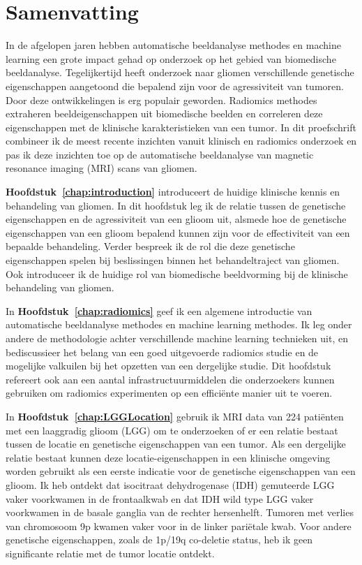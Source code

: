 \chapter{Samenvatting}
\begin{ChapterAbstractNoTitle}
\end{ChapterAbstractNoTitle}

In de afgelopen jaren hebben automatische beeldanalyse methodes en machine learning een grote impact gehad op onderzoek op het gebied van biomedische beeld\-analyse.
Tegelijkertijd heeft onderzoek naar gliomen verschillende genetische eigenschappen aangetoond die bepalend zijn voor de agressiviteit van tumoren.
Door deze ontwikkelingen is  erg populair geworden.
Radiomics methodes extraheren beeldeigenschappen uit biomedische beelden en correleren deze eigenschappen met de klinische karakteristieken van een tumor.
In dit proefschrift combineer ik de meest recente inzichten vanuit klinisch en radiomics onderzoek en pas ik deze inzichten toe op de automatische beeldanalyse van magnetic resonance imaging (MRI) scans van gliomen.


\textbf{Hoofdstuk~\ref{chap:introduction}} introduceert de huidige klinische kennis en behandeling van gliomen.
In dit hoofdstuk leg ik de relatie tussen de genetische eigenschappen en de agressiviteit van een glioom uit, alsmede hoe de genetische eigenschappen van een glioom bepalend kunnen zijn voor de effectiviteit van een bepaalde behandeling.
Verder bespreek ik de rol die deze genetische eigenschappen spelen bij beslissingen binnen het behandeltraject van gliomen.
Ook introduceer ik de huidige rol van biomedische beeldvorming bij de klinische behandeling van gliomen.

In \textbf{Hoofdstuk~\ref{chap:radiomics}} geef ik een algemene introductie van automatische beeldanalyse methodes en machine learning methodes.
Ik leg onder andere de methodologie achter verschillende machine learning technieken uit, en bediscussieer het belang van een goed uitgevoerde radiomics studie en de mogelijke valkuilen bij het opzetten van een dergelijke studie.
Dit hoofdstuk refereert ook aan een aantal infrastructuurmiddelen die onderzoekers kunnen gebruiken om radiomics experimenten op een effici{\"e}nte manier uit te voeren.

In \textbf{Hoofdstuk~\ref{chap:LGGLocation}} gebruik ik MRI data van 224 pati{\"e}nten met een  laaggradig glioom (LGG) om te onderzoeken of er een relatie bestaat tussen de locatie en genetische eigenschappen van een tumor.
Als een dergelijke relatie bestaat kunnen deze locatie-eigenschappen in een klinische omgeving worden gebruikt als een eerste indicatie voor de genetische eigenschappen van een glioom.
Ik heb ontdekt dat isocitraat dehydrogenase (IDH) gemuteerde LGG vaker voorkwamen in de frontaalkwab en dat IDH wild type LGG vaker voorkwamen in de basale ganglia van de rechter hersenhelft.
Tumoren met verlies van chromosoom 9p kwamen vaker voor in de linker pari{\"e}tale kwab.
Voor andere genetische eigenschappen, zoals de 1p/19q co-deletie status, heb ik geen significante relatie met de tumor locatie ontdekt.

